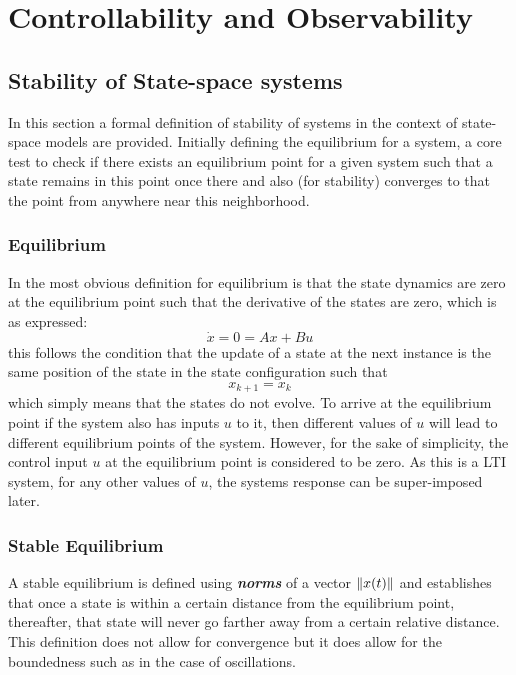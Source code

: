 \chapter{Controllability and Observability}

\section{Stability of State-space systems}

In this section a formal definition of stability of systems in the context of state-space models are provided. Initially defining the equilibrium for a system, a core test to check if there exists an equilibrium point for a given system such that a state remains in this point once there and also (for stability) converges to that the point from anywhere near this neighborhood.

\subsection{Equilibrium}

In the most obvious definition for equilibrium is that the state dynamics are zero at the equilibrium point such that the derivative of the states are zero, which is as expressed:
\begin{equation}
	\dot{x} = 0 = Ax + Bu
\end{equation}
this follows the condition that the update of a state at the next instance is the same position of the state in the state configuration such that
\begin{equation}
	x_{k+1} = x_{k}
\end{equation}
which simply means that the states do not evolve. To arrive at the equilibrium point if the system also has inputs $u$ to it, then different values of $u$ will lead to different equilibrium points of the system. However, for the sake of simplicity, the control input $u$ at the equilibrium point is considered to be zero. As this is a LTI system, for any other values of $u$, the systems response can be super-imposed later.

\subsection{Stable Equilibrium}

A stable equilibrium is defined using \textbf{\textit{norms}} of a vector $\lVert x(t)\rVert$ and establishes that once a state is within a certain distance from the equilibrium point, thereafter, that state will never go farther away from a certain relative distance. This definition does not allow for convergence but it does allow for the boundedness such as in the case of oscillations.

